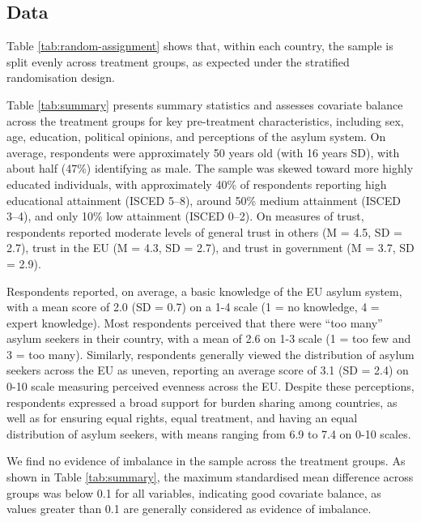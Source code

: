 \documentclass[
  12pt,
  a4paper,
]{article}
\begin{document}
\subsection{Data}\label{data}

Table \ref{tab:random-assignment} shows that, within each country, the sample is split evenly across treatment groups, as expected under the stratified randomisation design.

Table \ref{tab:summary} presents summary statistics and assesses covariate balance across the treatment groups for key pre-treatment characteristics, including sex, age, education, political opinions, and perceptions of the asylum system. On average, respondents were approximately 50 years old (with 16 years SD), with about half (47\%) identifying as male. The sample was skewed toward more highly educated individuals, with approximately 40\% of respondents reporting high educational attainment (ISCED 5--8), around 50\% medium attainment (ISCED 3--4), and only 10\% low attainment (ISCED 0--2). On measures of trust, respondents reported moderate levels of general trust in others (M = 4.5, SD = 2.7), trust in the EU (M = 4.3, SD = 2.7), and trust in government (M = 3.7, SD = 2.9).

Respondents reported, on average, a basic knowledge of the EU asylum system, with a mean score of 2.0 (SD = 0.7) on a 1-4 scale (1 = no knowledge, 4 = expert knowledge). Most respondents perceived that there were ``too many'' asylum seekers in their country, with a mean of 2.6 on 1-3 scale (1 = too few and 3 = too many). Similarly, respondents generally viewed the distribution of asylum seekers across the EU as uneven, reporting an average score of 3.1 (SD = 2.4) on 0-10 scale measuring perceived evenness across the EU. Despite these perceptions, respondents expressed a broad support for burden sharing among countries, as well as for ensuring equal rights, equal treatment, and having an equal distribution of asylum seekers, with means ranging from 6.9 to 7.4 on 0-10 scales.

We find no evidence of imbalance in the sample across the treatment groups. As shown in Table \ref{tab:summary}, the maximum standardised mean difference across groups was below 0.1 for all variables, indicating good covariate balance, as values greater than 0.1 are generally considered as evidence of imbalance.
\end{document}
